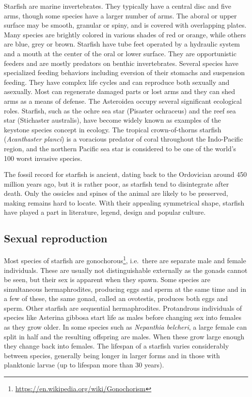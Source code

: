 \documentclass[]{book}
\let\rmarkdownfootnote\footnote%
\def\footnote{\protect\rmarkdownfootnote}
\renewcommand{\href}[2]{#2\footnote{\url{#1}}}
\begin{document}
Starfish are marine invertebrates. They typically have a central disc and five arms, though some species have a larger number of arms. The aboral or upper surface may be smooth, granular or spiny, and is covered with overlapping plates. Many species are brightly colored in various shades of red or orange, while others are blue, grey or brown. Starfish have tube feet operated by a hydraulic system and a mouth at the center of the oral or lower surface. They are opportunistic feeders and are mostly predators on benthic invertebrates. Several species have specialized feeding behaviors including eversion of their stomachs and suspension feeding. They have complex life cycles and can reproduce both sexually and asexually. Most can regenerate damaged parts or lost arms and they can shed arms as a means of defense. The Asteroidea occupy several significant ecological roles. Starfish, such as the ochre sea star (Pisaster ochraceus) and the reef sea star (Stichaster australis), have become widely known as examples of the keystone species concept in ecology. The tropical crown-of-thorns starfish (\emph{Acanthaster planci}) is a voracious predator of coral throughout the Indo-Pacific region, and the northern Pacific sea star is considered to be one of the world's 100 worst invasive species.

The fossil record for starfish is ancient, dating back to the Ordovician around 450 million years ago, but it is rather poor, as starfish tend to disintegrate after death. Only the ossicles and spines of the animal are likely to be preserved, making remains hard to locate. With their appealing symmetrical shape, starfish have played a part in literature, legend, design and popular culture.

\hypertarget{sexual-reproduction-1}{%
\subsection{Sexual reproduction}\label{sexual-reproduction-1}}

Most species of starfish are \href{https://en.wikipedia.org/wiki/Gonochorism}{gonochorous}, i.e.~there are separate male and female individuals. These are usually not distinguishable externally as the gonads cannot be seen, but their sex is apparent when they spawn. Some species are simultaneous hermaphrodites, producing eggs and sperm at the same time and in a few of these, the same gonad, called an ovotestis, produces both eggs and sperm. Other starfish are sequential hermaphrodites. Protandrous individuals of species like Asterina gibbosa start life as males before changing sex into females as they grow older. In some species such as \emph{Nepanthia belcheri}, a large female can split in half and the resulting offspring are males. When these grow large enough they change back into females. The lifespan of a starfish varies considerably between species, generally being longer in larger forms and in those with planktonic larvae (up to lifespan more than 30 years).
\end{document}
